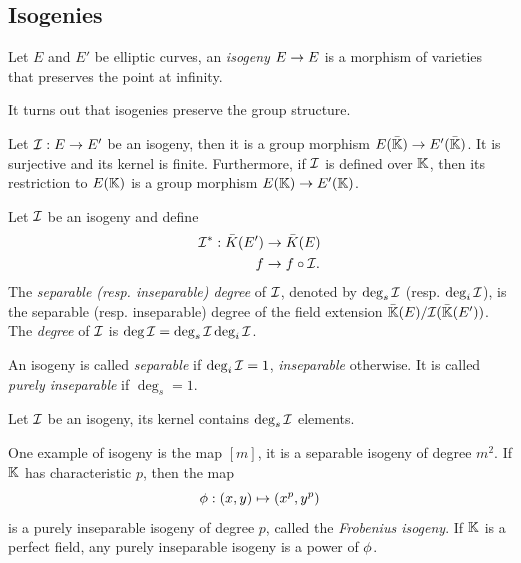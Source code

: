 \subsection{Isogenies}
\label{sec:isogenies}

\begin{definition}[Isogeny]
  Let $E$ and $E'$ be elliptic curves, an
  \emph{isogeny} $E\rightarrow E$ is a morphism of varieties
  that preserves the point at infinity.
\end{definition}

It turns out that isogenies preserve the group structure.

\begin{theorem}
  Let $\mathcal{I}:E\rightarrow E'$ be an isogeny, then it is a group morphism
  $E(\bar{\mathbb{K}})\rightarrow E'(\bar{\mathbb{K}})$. It is surjective and its kernel is
  finite. Furthermore, if $\mathcal{I}$ is defined over $\mathbb{K}$, then its
  restriction to $E(\mathbb{K})$ is a group morphism $E(\mathbb{K})\rightarrow E'(\mathbb{K})$.
\end{theorem}

\begin{definition}[Degree]
  Let $\mathcal{I}$ be an isogeny and
  define
  \begin{equation}
    \label{eq:138}
    \begin{aligned}
      \mathcal{I}^\ast:\bar{K}(E')&\rightarrow\bar{K}(E)\\
      f &\rightarrow f\circ\mathcal{I}
      \text{.}
    \end{aligned}
  \end{equation}
  The \emph{separable (resp. inseparable) degree} of $\mathcal{I}$, denoted by
  $\deg_s\mathcal{I}$ (resp. $\deg_i\mathcal{I}$), is the separable (resp. inseparable)
  degree of the field extension $\bar{\mathbb{K}}(E)/\mathcal{I}(\bar{\mathbb{K}}(E'))$. The
  \emph{degree} of $\mathcal{I}$ is $\deg\mathcal{I}=\deg_s\mathcal{I}\deg_i\mathcal{I}$.

  An isogeny is called \emph{separable} if
  $\deg_i\mathcal{I}=1$, \emph{inseparable}
  otherwise. It is called
  \emph{purely inseparable} if
  $\deg_s=1$.
\end{definition}

\begin{theorem}
  Let $\mathcal{I}$ be an isogeny, its kernel contains $\deg_s\mathcal{I}$ elements.
\end{theorem}

One example of isogeny is the map $[m]$, it is a separable isogeny of
degree $m^2$. If $\mathbb{K}$ has characteristic $p$, then the map
\begin{equation}
  \label{eq:139}
  \phi : (x,y) \mapsto (x^p,y^p)
\end{equation}
is a purely inseparable isogeny of degree $p$, called the
\emph{Frobenius
  isogeny}. If $\mathbb{K}$ is a perfect field, any purely
inseparable isogeny is a power of $\phi$.

